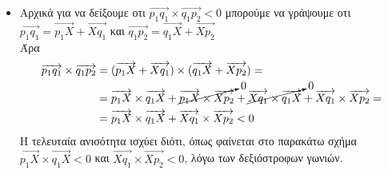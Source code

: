 \documentclass[12pt]{article}
\begin{document}
\begin{itemize}
    \item Αρχικά για να δείξουμε οτι $\overrightarrow{p_1q_1}\times \overrightarrow{q_1p_2}<0$ μπορούμε να γράψουμε οτι $\overrightarrow{p_1q_1} =\overrightarrow{p_1X} + \overrightarrow{Xq_1}  $ και $\overrightarrow{q_1p_2} =\overrightarrow{q_1X} + \overrightarrow{Xp_2}$\\
    Άρα 
    \begin{align*}
            \overrightarrow{p_1q_1}\times \overrightarrow{q_1p_2} &= (\overrightarrow{p_1X} + \overrightarrow{Xq_1}) \times (\overrightarrow{q_1X} + \overrightarrow{Xp_2}) = \\
            &=\overrightarrow{p_1X}\times \overrightarrow{q_1X} + \cancelto{0}{\overrightarrow{p_1X}\times \overrightarrow{Xp_2}} + \cancelto{0}{\overrightarrow{Xq_1}\times \overrightarrow{q_1X}} + \overrightarrow{Xq_1}\times \overrightarrow{Xp_2} = \\
            &=\overrightarrow{p_1X}\times \overrightarrow{q_1X} + \overrightarrow{Xq_1}\times \overrightarrow{Xp_2} < 0
    \end{align*}
    Η τελευταία ανισότητα ισχύει διότι, όπως φαίνεται στο παρακάτω σχήμα $\overrightarrow{p_1X}\times \overrightarrow{q_1X}<0$ και $\overrightarrow{Xq_1}\times \overrightarrow{Xp_2} < 0$, λόγω των δεξιόστροφων γωνιών.
    \begin{figure}[H]


\end{figure}
\end{itemize}
\end{document}
